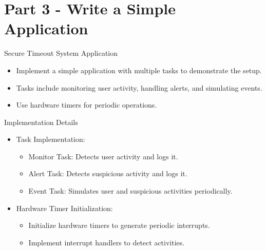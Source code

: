 
\section{Part 3 - Write a Simple Application}

\begin{frame}{Secure Timeout System Application}
    \begin{itemize}
        \item Implement a simple application with multiple tasks to demonstrate the setup.
        \item Tasks include monitoring user activity, handling alerts, and simulating events.
        \item Use hardware timers for periodic operations.
    \end{itemize}
\end{frame}

\begin{frame}{Implementation Details}
    \begin{itemize}
        \item Task Implementation:
        \begin{itemize}
            \item Monitor Task: Detects user activity and logs it.
            \item Alert Task: Detects suspicious activity and logs it.
            \item Event Task: Simulates user and suspicious activities periodically.
        \end{itemize}
        \item Hardware Timer Initialization:
        \begin{itemize}
            \item Initialize hardware timers to generate periodic interrupts.
            \item Implement interrupt handlers to detect activities.
        \end{itemize}
    \end{itemize}
\end{frame}
